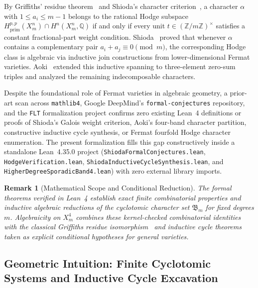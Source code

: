 \documentclass[11pt,a4paper]{article}
\newtheorem{remark}[theorem]{Remark}
\begin{document}
By Griffiths' residue theorem~\cite{Griffiths1969} and Shioda's character criterion~\cite{Shioda1979}, a character $\alpha$ with $1 \le a_i \le m - 1$ belongs to the rational Hodge subspace $H^{p,p}_{\mathrm{prim}}(X_m^n) \cap H^n(X_m^n, \mathbb{Q})$ if and only if every unit $t \in (\mathbb{Z}/m\mathbb{Z})^\times$ satisfies a constant fractional-part weight condition. Shioda~\cite{Shioda1979} proved that whenever $\alpha$ contains a complementary pair $a_i + a_j \equiv 0 \pmod{m}$, the corresponding Hodge class is algebraic via inductive join constructions from lower-dimensional Fermat varieties. Aoki~\cite{Aoki1983} extended this inductive spanning to three-element zero-sum triples and analyzed the remaining indecomposable characters.

Despite the foundational role of Fermat varieties in algebraic geometry, a prior-art scan across \texttt{mathlib4}, Google DeepMind's \texttt{formal-conjectures} repository, and the \texttt{FLT} formalization project confirms zero existing Lean~4 definitions or proofs of Shioda's Galois weight criterion, Aoki's four-band character partition, constructive inductive cycle synthesis, or Fermat fourfold Hodge character enumeration. The present formalization fills this gap constructively inside a standalone Lean~4.35.0 project (\texttt{ShiodaFormalConjectures.lean}, \texttt{HodgeVerification.lean}, \texttt{ShiodaInductiveCycleSynthesis.lean}, and \texttt{HigherDegreeSporadicBand4.lean}) with zero external library imports.

\begin{remark}[Mathematical Scope and Conditional Reduction]
  The formal theorems verified in Lean~4 establish exact finite combinatorial properties and inductive algebraic reductions of the cyclotomic character set $\mathfrak{B}_m$ for fixed degrees $m$. Algebraicity on $X_m^4$ combines these kernel-checked combinatorial identities with the classical Griffiths residue isomorphism~\cite{Griffiths1969} and inductive cycle theorems~\cite{Shioda1979,Aoki1983} taken as explicit conditional hypotheses for general varieties.
\end{remark}

\subsection{Geometric Intuition: Finite Cyclotomic Systems and Inductive Cycle Excavation}
\end{document}
